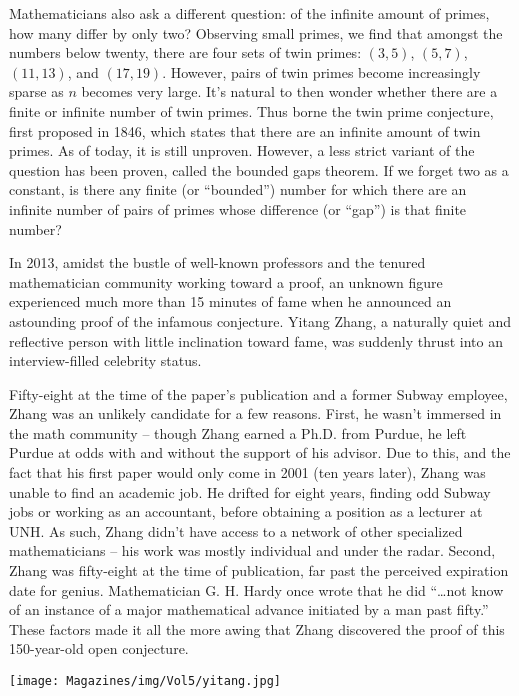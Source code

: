 \documentclass{article}
\begin{document}
\begin{multicols}{3}
Mathematicians also ask a different question: of the infinite amount of primes, how many differ by only two? Observing small primes, we find that amongst the numbers below twenty, there are four sets of twin primes: $(3, 5)$, $(5, 7)$, $(11, 13)$, and $(17, 19)$. However, pairs of twin primes become increasingly sparse as $n$ becomes very large. It’s natural to then wonder whether there are a finite or infinite number of twin primes. Thus borne the twin prime conjecture, first proposed in 1846, which states that there are an infinite amount of twin primes. As of today, it is still unproven. However, a less strict variant of the question has been proven, called the bounded gaps theorem. If we forget two as a constant, is there any finite (or “bounded”) number for which there are an infinite number of pairs of primes whose difference (or “gap”) is that finite number?

In 2013, amidst the bustle of well-known professors and the tenured mathematician community working toward a proof, an unknown figure experienced much more than 15 minutes of fame when he announced an astounding proof of the infamous conjecture. Yitang Zhang, a naturally quiet and reflective person with little inclination toward fame, was suddenly thrust into an interview-filled celebrity status. 

Fifty-eight at the time of the paper's publication and a former Subway employee, Zhang was an unlikely candidate for a few reasons. First, he wasn’t immersed in the math community – though Zhang earned a Ph.D. from Purdue, he left Purdue at odds with and without the support of his advisor. Due to this, and the fact that his first paper would only come in 2001 (ten years later), Zhang was unable to find an academic job. He drifted for eight years, finding odd Subway jobs or working as an accountant, before obtaining a position as a lecturer at UNH. As such, Zhang didn’t have access to a network of other specialized mathematicians – his work was mostly individual and under the radar. Second, Zhang was fifty-eight at the time of publication, far past the perceived expiration date for genius. Mathematician G. H. Hardy once wrote that he did “\dots not know of an instance of a major mathematical advance initiated by a man past fifty.” These factors made it all the more awing that Zhang discovered the proof of this 150-year-old open conjecture.

\begin{center}
    \footnotesize
    \texttt{[image: Magazines/img/Vol5/yitang.jpg]}
    

\end{center}
\end{multicols}
\end{document}
